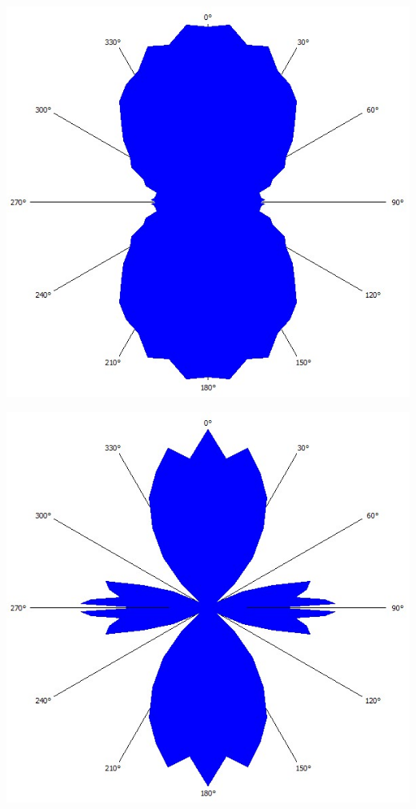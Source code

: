 \documentclass[german,  %
parskip=full,  %
]{scrartcl}
\begin{document}
\begin{minipage}{0.48 \textwidth} \centering
\includegraphics[scale=0.3]{432_Peak_1.jpg}
\end{minipage}
\begin{minipage}{0.48 \textwidth} \centering
\includegraphics[scale=0.3]{432_Peak_2.jpg}
\end{minipage}
\end{document}
